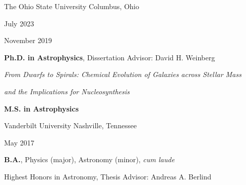 \documentclass[cv.tex]{subfiles}
\begin{document}
{\color{themecolor}\large The Ohio State University}
\hfill
Columbus, Ohio
\par\noindent
\parbox{0.18\textwidth}{%
	\raggedleft
	July 2023 \par
	\null \par
	\null \par
	November 2019
}
\hspace{1mm}
\parbox{0.8\textwidth}{%
	\textbf{Ph.D. in Astrophysics}, Dissertation Advisor: David H. Weinberg
	\par
	\textit{From Dwarfs to Spirals: Chemical Evolution of
	Galaxies across Stellar Mass} \par
	\textit{and the Implications for Nucleosynthesis} \par
	\textbf{M.S. in Astrophysics}
}

\vspace{3mm}
\noindent
{\color{themecolor}\large Vanderbilt University}
\hfill
Nashville, Tennessee
\par\noindent
\parbox{0.18\textwidth}{%
	\raggedleft
	May 2017 \par
	\null
}
\hspace{1mm}
\parbox{0.8\textwidth}{%
	\vspace{1mm}
	\textbf{B.A.}, Physics (major), Astronomy (minor), \textit{cum laude} \par
	Highest Honors in Astronomy, Thesis Advisor: Andreas A. Berlind
}
\end{document}
